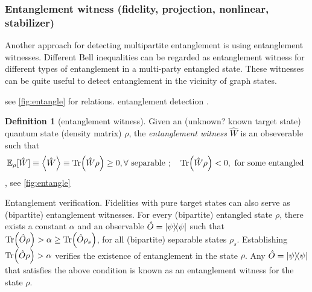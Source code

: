 \documentclass[
aps,
pra,
floatfix,
]{revtex4-2}
\theoremstyle{plain}
\theoremstyle{definition}
\newtheorem{definition}{Definition}
\newcommand{\ew}{\hat{W}}
\newcommand{\ob}{\hat{O}}
\newcommand{\dm}{\rho}
\begin{document}
\subsubsection{Entanglement witness (fidelity, projection, nonlinear, stabilizer)}\label{sec:entanglement_witness}
Another approach for detecting multipartite entanglement is using entanglement witnesses.
Different Bell inequalities can be regarded as entanglement witness for different types of entanglement in a multi-party entangled state.
These witnesses can be quite useful to detect entanglement in the vicinity of graph states.



see \cref{fig:entangle} for relations.
entanglement detection \cite{guhneEntanglementDetection2009}.
\begin{definition}[entanglement witness]\label{def:entanglement_witness}
	Given an (unknown? known target state) quantum state (density matrix) $\dm$, the \emph{entanglement witness} $\ew$ is an obseverable such that
	\begin{equation}
		\expectation_{\dm}[\ew]\equiv\expval{\ew}\equiv
		\Tr(\ew\dm) \ge 0 , \forall \text{ separable };\quad
		\Tr(\ew\dm) < 0 , \text{ for some entangled }
	\end{equation}
	\cite{terhalBellInequalitiesSeparability2000}, see \cref{fig:entangle}
\end{definition}
Entanglement verification. Fidelities with pure target states can also serve as (bipartite) entanglement witnesses. For every (bipartite) entangled state $\dm$, there exists a constant $\alpha$ and an observable $\ob = \op{\psi}$ such that $\Tr(\ob \dm ) > \alpha \ge \Tr(\ob \dm_s )$, for all (bipartite) separable states $\dm_s$. Establishing $\Tr(\ob \dm ) > \alpha$ verifies the existence of entanglement in the state $\dm$. Any $\ob = \op{\psi}$ that satisfies the above condition is known as an entanglement witness for the state $\dm$. 
\end{document}
